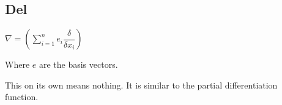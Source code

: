 
\subsection{Del}

\(\nabla =(\sum_{i=1}^n e_i\dfrac{\delta }{\delta x_i})\)

Where \(e\) are the basis vectors.

This on its own means nothing. It is similar to the partial differentiation function.

